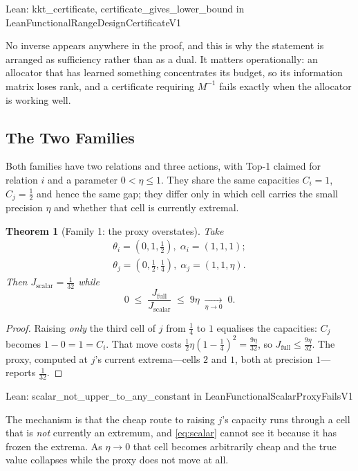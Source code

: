 \documentclass[conference]{IEEEtran}
\newtheorem{theorem}{Theorem}
\theoremstyle{definition}
\newcommand{\lean}[1]{\textsf{\footnotesize #1}}
\newcommand{\leanbox}[1]{%
  \par\vspace{2pt}\noindent
  {\footnotesize\textsf{Lean: #1}}\par\vspace{2pt}}
\begin{document}
\leanbox{\lean{kkt\_certificate}, \lean{certificate\_gives\_lower\_bound} in
\lean{LeanFunctionalRangeDesignCertificateV1}}

No inverse appears anywhere in the proof, and this is why the statement is arranged as
sufficiency rather than as a dual. It matters operationally: an allocator that has learned
something concentrates its budget, so its information matrix loses rank, and a certificate
requiring $M^{-1}$ fails exactly when the allocator is working well.

\subsection{The Two Families}
\label{sec:families}

Both families have two relations and three actions, with Top-1 claimed for relation $i$ and a
parameter $0<\eta\le1$. They share the same capacities $C_{i}=1$, $C_{j}=\tfrac12$ and hence
the same gap; they differ only in which cell carries the small precision $\eta$ and whether
that cell is currently extremal.

\begin{theorem}[Family 1: the proxy overstates]
\label{thm:family1}
Take
\begin{align}
\theta_{i}=(0,1,\tfrac12),\;\alpha_{i}=(1,1,1);\\
\theta_{j}=(0,\tfrac12,\tfrac14),\;\alpha_{j}=(1,1,\eta).
\end{align}
Then $J_{\mathrm{scalar}}=\tfrac{1}{32}$ while
\begin{equation}
0\;\leq\;\frac{J_{\mathrm{full}}}{J_{\mathrm{scalar}}}\;\leq\;9\eta
\;\xrightarrow[\eta\to0]{}\;0 .
\label{eq:family1}
\end{equation}
\end{theorem}

\begin{proof}
Raising \emph{only} the third cell of $j$ from $\tfrac14$ to $1$ equalises the capacities:
$C_{j}$ becomes $1-0=1=C_{i}$. That move costs
$\tfrac12\eta(1-\tfrac14)^{2}=\tfrac{9\eta}{32}$, so
$J_{\mathrm{full}}\le\tfrac{9\eta}{32}$. The proxy, computed at $j$'s current extrema---cells
$2$ and $1$, both at precision $1$---reports $\tfrac{1}{32}$.
\end{proof}

\leanbox{\lean{scalar\_not\_upper\_to\_any\_constant} in
\lean{LeanFunctionalScalarProxyFailsV1}}

The mechanism is that the cheap route to raising $j$'s capacity runs through a cell that is
\emph{not} currently an extremum, and \eqref{eq:scalar} cannot see it because it has frozen
the extrema. As $\eta\to0$ that cell becomes arbitrarily cheap and the true value collapses
while the proxy does not move at all.
\end{document}
